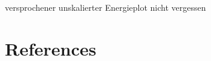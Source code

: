 \documentclass[a4paper,parskip,11pt, DIV12]{scrreprt}
\makeatletter
\newcommand{\labeltext}[2]{%
  \@bsphack
  \csname phantomsection\endcsname %
  \def\@currentlabel{#1}{\label{#2}}%
  \@esphack
}
\makeatother
\begin{document}
versprochener unskalierter Energieplot nicht vergessen

\section{References}












\end{document}
